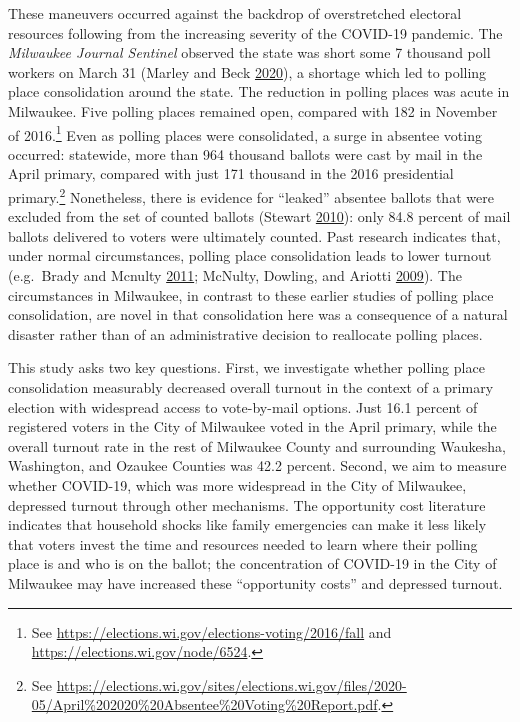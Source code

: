 \documentclass[
  12pt,
]{article}
\begin{document}
These maneuvers occurred against the backdrop of overstretched electoral resources following from the increasing severity of the COVID-19 pandemic. The \emph{Milwaukee Journal Sentinel} observed the state was short some 7 thousand poll workers on March 31 (Marley and Beck \protect\hyperlink{ref-Marley2020}{2020}), a shortage which led to polling place consolidation around the state. The reduction in polling places was acute in Milwaukee. Five polling places remained open, compared with 182 in November of 2016.\footnote{See \url{https://elections.wi.gov/elections-voting/2016/fall} and \url{https://elections.wi.gov/node/6524}.} Even as polling places were consolidated, a surge in absentee voting occurred: statewide, more than 964 thousand ballots were cast by mail in the April primary, compared with just 171 thousand in the 2016 presidential primary.\footnote{See \url{https://elections.wi.gov/sites/elections.wi.gov/files/2020-05/April\%202020\%20Absentee\%20Voting\%20Report.pdf}.} Nonetheless, there is evidence for ``leaked'' absentee ballots that were excluded from the set of counted ballots (Stewart \protect\hyperlink{ref-Stewart2010}{2010}): only 84.8 percent of mail ballots delivered to voters were ultimately counted. Past research indicates that, under normal circumstances, polling place consolidation leads to lower turnout (e.g.~Brady and Mcnulty \protect\hyperlink{ref-Brady2011}{2011}; McNulty, Dowling, and Ariotti \protect\hyperlink{ref-McNulty2009}{2009}). The circumstances in Milwaukee, in contrast to these earlier studies of polling place consolidation, are novel in that consolidation here was a consequence of a natural disaster rather than of an administrative decision to reallocate polling places.

This study asks two key questions. First, we investigate whether polling place consolidation measurably decreased overall turnout in the context of a primary election with widespread access to vote-by-mail options. Just 16.1 percent of registered voters in the City of Milwaukee voted in the April primary, while the overall turnout rate in the rest of Milwaukee County and surrounding Waukesha, Washington, and Ozaukee Counties was 42.2 percent. Second, we aim to measure whether COVID-19, which was more widespread in the City of Milwaukee, depressed turnout through other mechanisms. The opportunity cost literature indicates that household shocks like family emergencies can make it less likely that voters invest the time and resources needed to learn where their polling place is and who is on the ballot; the concentration of COVID-19 in the City of Milwaukee may have increased these ``opportunity costs'' and depressed turnout.
\end{document}
